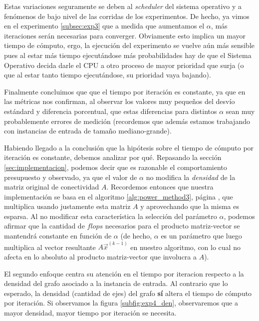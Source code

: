 \par Estas variaciones seguramente se deben al \emph{scheduler} del sistema
operativo y a fenómenos de bajo nivel de las corridas de los
experimentos. De hecho, ya vimos en el experimento \ref{subsec:exp3} que a
medida que aumentamos el $\alpha$, m\'as iteraciones ser\'an necesarias para
converger. Obviamente esto implica un mayor tiempo de c\'omputo, ergo, la
ejecuci\'on del experimento se vuelve a\'un m\'as sensible pues al estar m\'as
tiempo ejecut\'andose m\'as probabilidades hay de que el Sistema Operativo
decida darle el CPU a otro proceso de mayor prioridad que surja (o que al estar
tanto tiempo ejecut\'andose, su prioridad vaya bajando).

\par Finalmente concluimos que que el tiempo por iteraci\'on es constante, ya
que en las m\'etricas nos confirman, al observar los valores muy peque\~nos del
desv\'io est\'andard y diferencia porcentual, que estas diferencias para
distintos $\alpha$ sean muy probablemente errores de medici\'on (recordemos que
adem\'as estamos trabajando con instancias de entrada de tama\~no
mediano-grande).

\par Habiendo llegado a la conclusi\'on que la hip\'otesis sobre el tiempo de
c\'omputo por iteraci\'on es constante, debemos analizar por qu\'e. Repasando la
secci\'on \ref{sec:implementacion}, podemos decir que es razonable el
comportamiento presupuesto y observado, ya que el valor de $\alpha$ no modifica
la \emph{densidad} de la matriz original de conectividad $A$. Recordemos
entonces que nuestra implementaci\'on se basa en el algoritmo
\ref{alg:power_method3}, p\'agina \pageref{alg:power_method3}, que multiplica
usando justamente esta matriz $A$ y aprovechando que la misma es esparsa. Al no
modificar esta caracter\'istica la selecci\'on del par\'ametro $\alpha$, podemos
afirmar que la cantidad de $flops$ necesarios para el producto matriz-vector se
mantendr\'a constante en funci\'on de $\alpha$ (de hecho, $\alpha$ es un
par\'ametro que luego multiplica al vector resultante $A\vec{x}^{(k-1)}$ en
nuestro algoritmo, con lo cual no afecta en lo absoluto al producto
matriz-vector que involucra a $A$).

\par El segundo enfoque centra su atención en el tiempo por
iteracion respecto a la densidad del grafo asociado a la instancia de entrada.
Al contrario que lo esperado, la densidad (cantidad de ejes) del
grafo \textbf{s\'i} altera el tiempo de cómputo por iteración. Si observamos la
figura \ref{subfig:exp4_den}, observaremos que a mayor densidad, mayor tiempo
por iteraci\'on se necesita.


